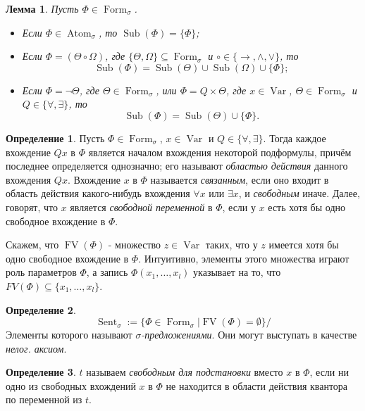 \documentclass[a4paper,100pt]{article}
\theoremstyle{indented}
\newtheorem{lemma}{Лемма}
\theoremstyle{definition}
\newtheorem{defn}{Определение}
\theoremstyle{remark}
\DeclareMathOperator{\ra}{\rightarrow}
\DeclareMathOperator{\form}{Form}
\DeclareMathOperator{\Var}{Var}
\DeclareMathOperator{\Sub}{Sub}
\DeclareMathOperator{\Atom}{Atom}
\DeclareMathOperator{\FV}{FV}
\DeclareMathOperator{\Sent}{Sent}
\begin{document}
\begin{lemma}
  Пусть $\Phi \in \form_\sigma$. 

  \begin{itemize}
    \item Если $\Phi \in \Atom_\sigma$, то $\Sub (\Phi)=\{ \Phi\}$;
    \item Если $\Phi = (\Theta \circ \Omega)$, где $\{\Theta, \Omega\}\subseteq \form_\sigma$ и $\circ \in \{\ra, \wedge, \vee\}$, то 
    \[
      \Sub(\Phi)=\Sub(\Theta)\cup \Sub(\Omega)\cup \{\Phi\};
    \]
    \item Если $\Phi=\neg \Theta$, где $\Theta \in \form_\sigma$, или $\Phi=Q\times \Theta$, где $x\in \Var$, $\Theta \in \form_\sigma$ и $Q\in \{\forall, \exists\}$, то 
    \[
      \Sub(\Phi)= \Sub(\Theta)\cup \{\Phi\}. 
    \]
  \end{itemize}
\end{lemma}

\begin{defn}
  Пусть $\Phi \in \form_\sigma$, $x\in \Var$ и $Q\in \{\forall, \exists\}$. Тогда каждое вхождение $Qx$ в $\Phi$ является началом вхождения некоторой подформулы, причём последнее определяется однозначно; его называют \textit{областью действия} данного вхождения $Qx$. Вхождение $x$ в $\Phi$ называется \textit{связанным}, если оно входит в область действия какого-нибудь вхождения $\forall x$ или $\exists x$, и \textit{свободным} иначе. Далее, говорят, что $x$ является \textit{свободной переменной} в $\Phi$, если у $x$ есть хотя бы одно свободное вхождение в $\Phi$. \ 

  Скажем, что $\FV(\Phi)$ - множество $z\in \Var$ таких, что у $z$ имеется хотя бы одно свободное вхождение в $\Phi$. Интуитивно, элементы этого множества играют роль параметров $\Phi$, а запись $\Phi(x_1, \ldots, x_l)$ указывает на то, что $FV(\Phi)\subseteq \{x_1, \ldots, x_l\}$. 
\end{defn}

\begin{defn}
  \[
    \Sent_\sigma := \{\Phi \in \form_\sigma | \FV (\Phi)=\emptyset\}/ 
  \]
  Элементы которого называют \textit{$\sigma$-предложениями}. Они могут выступать в качестве \textit{нелог. аксиом}.
\end{defn}

\begin{defn}
  $t$ называем \textit{свободным для подстановки} вместо $x$ в $\Phi$, если ни одно из свободных вхождений $x$ в $\Phi$ не находится в области действия квантора по переменной из $t$. 
\end{defn}
\end{document}
